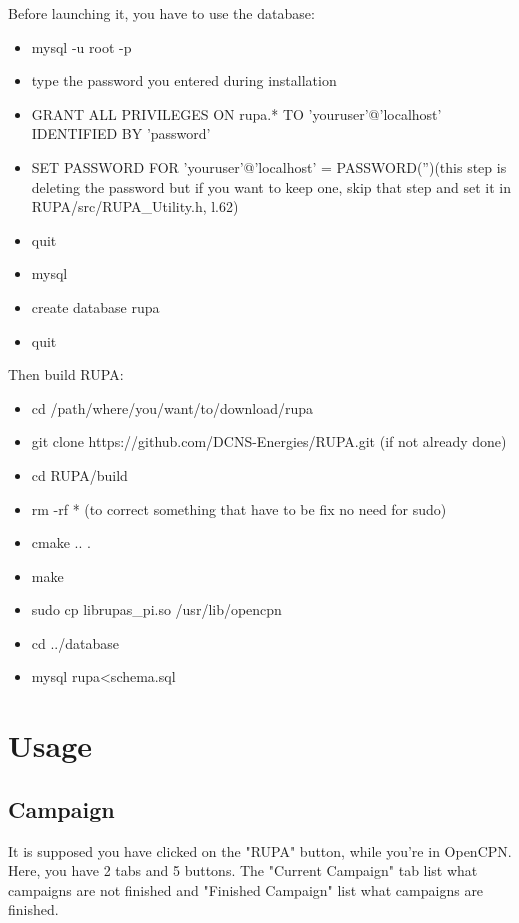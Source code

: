 \documentclass[11pt]{report}
\begin{document}
            Before launching it, you have to use the database:
            \begin{itemize}
                \item mysql -u root -p
                \item type the password you entered during installation
                \item GRANT ALL PRIVILEGES ON rupa.* TO 'youruser'@'localhost' IDENTIFIED BY 'password' 
                \item SET PASSWORD FOR 'youruser'@'localhost' = PASSWORD('')(this step is deleting the password but if you want to keep one, skip that step and set it in RUPA/src/RUPA\_Utility.h, l.62)
                \item quit
                \item mysql
                \item create database rupa
                \item quit
            \end{itemize}

            Then build RUPA:
            \begin{itemize}
                \item cd /path/where/you/want/to/download/rupa
                \item git clone https://github.com/DCNS-Energies/RUPA.git (if not already done)
                \item cd RUPA/build
                \item rm -rf * (to correct something that have to be fix no need for sudo)
                \item cmake .. .
                \item make
                \item sudo cp librupas\_pi.so /usr/lib/opencpn
                \item cd ../database
                \item mysql rupa<schema.sql
            \end {itemize}
            
	    \section{Usage}
		\subsection{Campaign}
		    It is supposed you have clicked on the "RUPA" button, while you're in OpenCPN.
		    Here, you have 2 tabs and 5 buttons. The "Current Campaign" tab list what campaigns are not finished
		    and "Finished Campaign" list what campaigns are finished.
\end{document}
